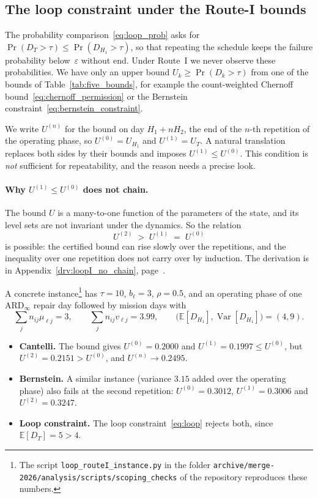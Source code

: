 \documentclass[11pt,a4paper]{article}
\theoremstyle{plain}
\theoremstyle{definition}
\theoremstyle{remark}
\begin{document}
\subsection{The loop constraint under the Route-I bounds}
\label{sec:loop_routeI}

The probability comparison~\eqref{eq:loop_prob} asks for $\Pr(D_T > \tau) \le \Pr(D_{H_1} > \tau)$, so that repeating the schedule keeps the failure probability below~$\varepsilon$ without end.
Under Route~I we never observe these probabilities.
We have only an upper bound $U_k \ge \Pr(D_k > \tau)$ from one of the bounds of Table~\ref{tab:five_bounds}, for example the count-weighted Chernoff bound~\eqref{eq:chernoff_permission} or the Bernstein constraint~\eqref{eq:bernstein_constraint}.

We write $U^{(n)}$ for the bound on day $H_1 + nH_2$, the end of the $n$-th repetition of the operating phase, so $U^{(0)} = U_{H_1}$ and $U^{(1)} = U_T$.
A natural translation replaces both sides by their bounds and imposes $U^{(1)} \le U^{(0)}$.
This condition is \emph{not} sufficient for repeatability, and the reason needs a precise look.

\paragraph{Why $U^{(1)} \le U^{(0)}$ does not chain.}
The bound $U$ is a many-to-one function of the parameters of the state, and its level sets are not invariant under the dynamics.
So the relation
\begin{equation}\label{eq:loopI_U_rise}
  U^{(2)} \;>\; U^{(1)} \;=\; U^{(0)}
\end{equation}
is possible: the certified bound can rise slowly over the repetitions, and the inequality over one repetition does not carry over by induction.
The derivation is in Appendix~\ref{drv:loopI_no_chain}, page~\pageref{drv:loopI_no_chain}.

A concrete instance\footnote{The script \texttt{loop\_routeI\_instance.py} in the folder \texttt{archive/merge-2026/analysis/scripts/\allowbreak scoping\_checks} of the repository reproduces these numbers.} has $\tau = 10$, $b_\ell = 3$, $\rho = 0.5$, and an operating phase of one $\text{ARD}_\infty$ repair day followed by mission days with
\begin{equation}
  \sum_j n_{ij}\mu_{\ell j} = 3,
  \qquad
  \sum_j n_{ij} v_{\ell j} = 3.99,
  \qquad
  \bigl(\mathbb{E}[D_{H_1}],\operatorname{Var}[D_{H_1}]\bigr) = (4,9).
\end{equation}
\begin{itemize}
  \item \textbf{Cantelli.} The bound gives $U^{(0)} = 0.2000$ and $U^{(1)} = 0.1997 \le U^{(0)}$, but $U^{(2)} = 0.2151 > U^{(0)}$, and $U^{(n)} \to 0.2495$.
  \item \textbf{Bernstein.} A similar instance (variance $3.15$ added over the operating phase) also fails at the second repetition: $U^{(0)} = 0.3012$, $U^{(1)} = 0.3006$ and $U^{(2)} = 0.3247$.
  \item \textbf{Loop constraint.} The loop constraint~\eqref{eq:loop} rejects both, since $\mathbb{E}[D_T] = 5 > 4$.
\end{itemize}
\end{document}
